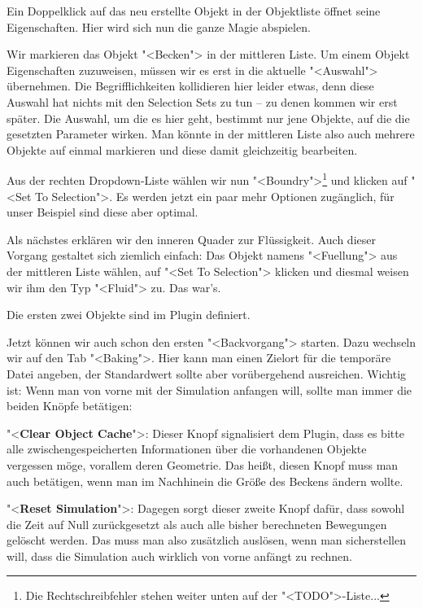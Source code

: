 \documentclass[10pt,DIV=14,a4paper]{scrartcl}
\begin{document}
Ein Doppelklick auf das neu erstellte Objekt in der Objektliste öffnet
seine Eigenschaften. Hier wird sich nun die ganze Magie abspielen.

Wir markieren das Objekt "<Becken"> in der mittleren
Liste. Um einem
Objekt Eigenschaften zuzuweisen, müssen wir es erst in die aktuelle
"<Auswahl"> übernehmen. Die Begrifflichkeiten kollidieren hier leider
etwas, denn diese Auswahl hat nichts mit den Selection Sets zu tun -- zu
denen kommen wir erst später. Die Auswahl, um die es hier geht, bestimmt
nur jene Objekte, auf die die gesetzten Parameter wirken. Man könnte in
der mittleren Liste also auch mehrere Objekte auf einmal markieren und
diese damit gleichzeitig bearbeiten.

Aus der rechten Dropdown-Liste wählen wir nun "<Boundry">\footnote{Die
Rechtschreibfehler stehen weiter unten auf der "<TODO">-Liste...} und
klicken auf "<Set To Selection">. Es werden jetzt ein paar mehr Optionen
zugänglich, für unser Beispiel sind diese aber optimal.

Als nächstes erklären wir den inneren Quader zur
Flüssigkeit. Auch dieser Vorgang gestaltet sich ziemlich
einfach: Das Objekt namens "<Fuellung"> aus der mittleren Liste wählen,
auf "<Set To Selection"> klicken und diesmal weisen wir ihm den Typ
"<Fluid"> zu. Das war's.

{Die ersten zwei Objekte sind im Plugin definiert.}

Jetzt können wir auch schon den ersten "<Backvorgang">
starten. Dazu wechseln wir auf den Tab "<Baking">. Hier
kann man einen Zielort für die temporäre Datei angeben, der Standardwert
sollte aber vorübergehend ausreichen. Wichtig ist: Wenn man von vorne
mit der Simulation anfangen will, sollte man immer die beiden Knöpfe
betätigen:

\itA
	\item "<\textbf{Clear Object Cache}">: Dieser Knopf signalisiert dem
	Plugin, dass es bitte alle zwischengespeicherten Informationen über
	die vorhandenen Objekte vergessen möge, vorallem deren Geometrie.
	Das heißt, diesen Knopf muss man auch betätigen, wenn man im
	Nachhinein die Größe des Beckens ändern wollte.

	\item "<\textbf{Reset Simulation}">: Dagegen sorgt dieser zweite
	Knopf dafür, dass sowohl die Zeit auf Null zurückgesetzt als auch
	alle bisher berechneten Bewegungen gelöscht werden. Das muss man
	also zusätzlich auslösen, wenn man sicherstellen will, dass die
	Simulation auch wirklich von vorne anfängt zu rechnen.
\end{document}
